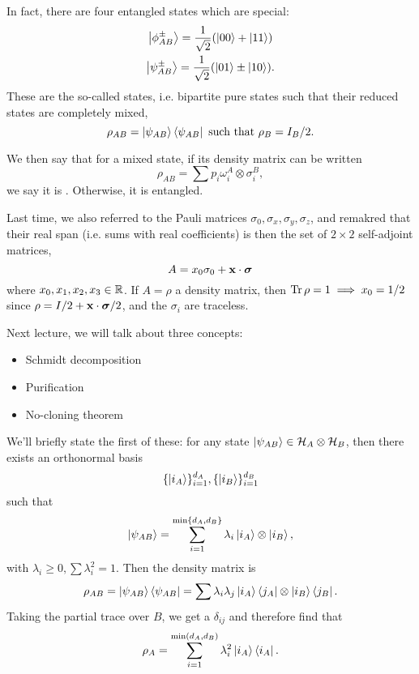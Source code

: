 In fact, there are four entangled states which are special:
\begin{gather}
    \left| \phi^\pm_{AB} \right>=\frac{1}{\sqrt{2}}(\left| 00 \right>+\left| 11 \right>)\\
    \left| \psi^\pm_{AB} \right> = \frac{1}{\sqrt{2}}(\left| 01 \right>\pm \left| 10 \right>).
\end{gather}
These are the so-called  states, i.e. bipartite pure states such that their reduced states are completely mixed,
\begin{equation}
    \rho_{AB}=\left| \psi_{AB} \right>\left< \psi_{AB} \right|\text{ such that }\rho_B=I_B/2.
\end{equation}

We then say that for a mixed state, if its density matrix can be written
\begin{equation}
    \rho_{AB} = \sum p_i \omega_i^A \otimes \sigma_i^B,
\end{equation}
we say it is . Otherwise, it is entangled.

Last time, we also referred to the Pauli matrices $\sigma_0,\sigma_x,\sigma_y,\sigma_z$, and remakred that their real span (i.e. sums with real coefficients) is then the set of $2\times 2$ self-adjoint matrices,
\begin{equation*}
    A=x_0\sigma_0 +\boldsymbol{\mathbf{x}} \cdot \mbox{\boldmath$ \sigma $}
\end{equation*}
where $x_0,x_1,x_2,x_3\in \mathbb{R}$. If $A=\rho$ a density matrix, then $\operatorname{Tr} \rho=1 \implies x_0=1/2$ since $\rho=I/2 + \boldsymbol{\mathbf{x}} \cdot \mbox{\boldmath$ \sigma $}/2$, and the $\sigma_i$ are traceless.

Next lecture, we will talk about three concepts:
\begin{itemize}
    \item Schmidt decomposition
    \item Purification
    \item No-cloning theorem
\end{itemize}
We'll briefly state the first of these: for any state $\left| \psi_{AB} \right>\in \mathcal H_A \otimes \mathcal H_B$, then there exists an orthonormal basis
\begin{equation}
    \{\left| i_A \right>\}_{i=1}^{d_A},\{\left| i_B \right>\}_{i=1}^{d_B}
\end{equation}
such that
\begin{equation}
    \left| \psi_{AB} \right>=\sum_{i=1}^{\min\{d_A,d_B\}}\lambda_i \left| i_A \right>\otimes \left| i_B \right>,
\end{equation}
with $\lambda_i \geq 0, \sum \lambda_i^2 = 1$. Then the density matrix is
\begin{equation}
    \rho_{AB}=\left| \psi_{AB} \right>\left< \psi_{AB} \right| = \sum \lambda_i \lambda_j \left| i_A \right>\left< j_A \right|\otimes \left| i_B \right> \left< j_B \right|.
\end{equation}
Taking the partial trace over $B$, we get a $\delta_{ij}$ and therefore find that
\begin{equation}
    \rho_A= \sum_{i=1}^{\min(d_A,d_B)} \lambda_i^2 \left| i_A \right>\left< i_A \right|.
\end{equation}